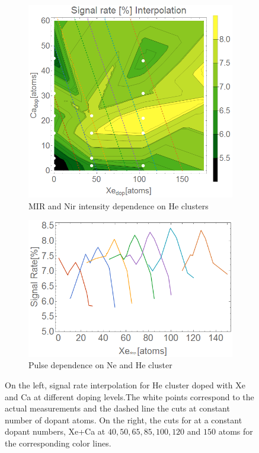 \begin{figure}[h!]
\hfill
\begin{subfigure}[l]{0.48\textwidth}
\caption{MIR and Nir intensity dependence on He clusters}
\includegraphics[width=1\textwidth]{../Images/results/MIR_He_XeCaDop/interpolationSignalRate.png} 
\end{subfigure} 
\begin{subfigure}[l]{0.48\textwidth}
\caption{Pulse dependence on Ne and He cluster}
\includegraphics[width=1\textwidth]{../Images/results/MIR_He_XeCaDop/interpolationSignalRatelines.png} 
\end{subfigure} 
\hfill
\caption[Xe-Ca interpolation signal rate]{On the left, signal rate interpolation for He cluster doped with Xe and Ca at different doping levels.The white points correspond to the actual measurements and the dashed line the cuts at constant number of dopant atoms. On the right, the cuts for at a constant dopant numbers, Xe+Ca at $40,50,65,85,100,120$ and $150$ atoms for the corresponding color lines.}
\label{fig:XEcasig}
\end{figure}

